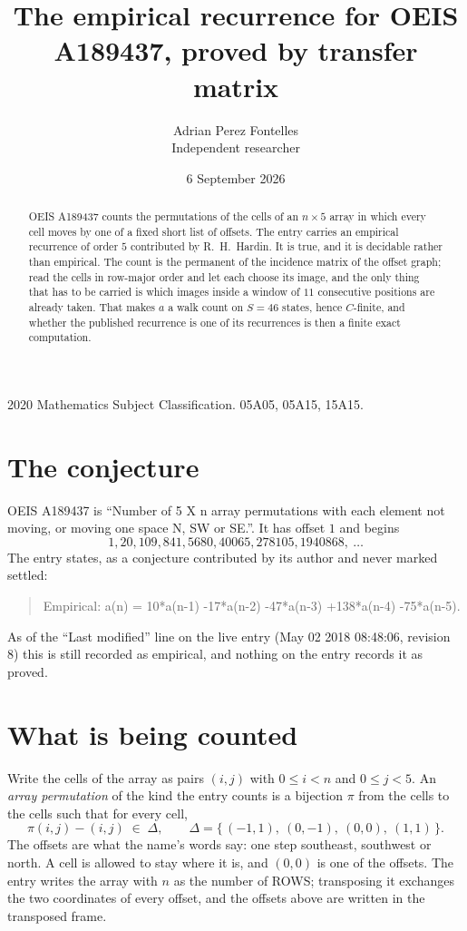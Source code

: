 \documentclass[11pt,a4paper]{article}
\title{The empirical recurrence for OEIS A189437, proved by transfer matrix}
\author{Adrian Perez Fontelles\\ \small Independent researcher}
\date{6 September 2026}
\theoremstyle{plain}
\theoremstyle{definition}
\begin{document}
\maketitle

\begin{abstract}
OEIS A189437 counts the permutations of the cells of an $n\times5$ array in which every cell
moves by one of a fixed short list of offsets. The entry carries an empirical recurrence of
order $5$ contributed by R.~H.~Hardin. It is true, and it is decidable rather than
empirical. The count is the permanent of the incidence matrix of the offset graph; read the
cells in row-major order and let each choose its image, and the only thing that has to be
carried is which images inside a window of $11$ consecutive positions are already taken.
That makes $a$ a walk count on $S=46$ states, hence $C$-finite, and whether the published
recurrence is one of its recurrences is then a finite exact computation.
\end{abstract}

\noindent\small 2020 Mathematics Subject Classification. 05A05, 05A15, 15A15.\normalsize

\section{The conjecture}

OEIS A189437 is ``Number of 5 X n array permutations with each element not moving, or moving one space N, SW or SE.''. It has offset $1$ and begins
\[
1, 20, 109, 841, 5680, 40065, 278105, 1940868,\ \dots
\]
The entry states, as a conjecture contributed by its author and never marked settled:
\begin{quote}
Empirical: a(n) = 10*a(n-1) -17*a(n-2) -47*a(n-3) +138*a(n-4) -75*a(n-5).
\end{quote}
As of the ``Last modified'' line on the live entry (May 02 2018 08:48:06, revision 8) this is still
recorded as empirical, and nothing on the entry records it as proved.

\section{What is being counted}

Write the cells of the array as pairs $(i,j)$ with $0\le i<n$ and $0\le j<5$. An
\emph{array permutation} of the kind the entry counts is a bijection $\pi$ from the cells to
the cells such that for every cell,
\[
\pi(i,j)-(i,j)\;\in\;\Delta,\qquad
\Delta=\{\,(-1,1),\ (0,-1),\ (0,0),\ (1,1)\,\}.
\]
The offsets are what the name's words say: one step southeast, southwest or north. A cell is allowed to stay where it is, and $(0,0)$ is one of the offsets. The entry writes the array with $n$ as the number of ROWS; transposing it exchanges the two coordinates of every offset, and the offsets above are written in the transposed frame.
\end{document}
